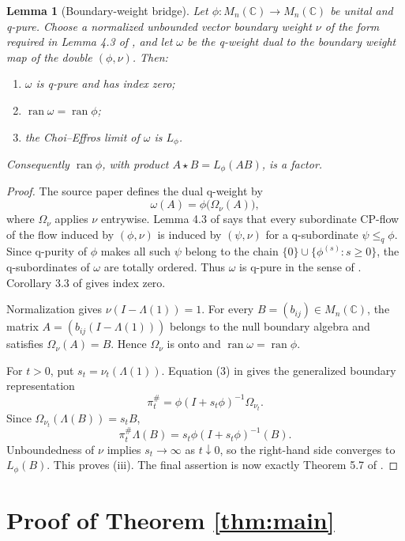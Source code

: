 \documentclass[11pt]{article}
\newtheorem{lemma}{Lemma}
\newcommand{\C}{\mathbb C}
\newcommand{\ran}{\operatorname{ran}}
\begin{document}
\begin{lemma}[Boundary-weight bridge]\label{lem:bridge}
Let $\phi:M_n(\C)\to M_n(\C)$ be unital and q-pure.  Choose a normalized
unbounded vector boundary weight $\nu$ of the form required in Lemma 4.3 of
\cite{Jankowski2009}, and let $\omega$ be the q-weight dual to the boundary
weight map of the double $(\phi,\nu)$. Then:
\begin{enumerate}[label=(\roman*),leftmargin=2.2em]
  \item $\omega$ is q-pure and has index zero;
  \item $\ran\omega=\ran\phi$;
  \item the Choi--Effros limit of $\omega$ is $L_\phi$.
\end{enumerate}
Consequently $\ran\phi$, with product $A\star B=L_\phi(AB)$, is a factor.
\end{lemma}

\begin{proof}
The source paper defines the dual q-weight by
\[
  \omega(A)=\phi\bigl(\Omega_\nu(A)\bigr),
\]
where $\Omega_\nu$ applies $\nu$ entrywise.  Lemma 4.3 of
\cite{Jankowski2009} says that every subordinate CP-flow of the flow induced
by $(\phi,\nu)$ is induced by $(\psi,\nu)$ for a q-subordinate
$\psi\leq_q\phi$.  Since q-purity of $\phi$ makes all such $\psi$ belong to
the chain $\{0\}\cup\{\phi^{(s)}:s\geq0\}$, the q-subordinates of $\omega$
are totally ordered.  Thus $\omega$ is q-pure in the sense of
\cite[Definition 1.2]{JMP2018}.  Corollary 3.3 of
\cite{Jankowski2009} gives index zero.

Normalization gives $\nu(I-\Lambda(1))=1$.  For every $B=(b_{ij})\in
M_n(\C)$, the matrix $A=(b_{ij}(I-\Lambda(1)))$ belongs to the null boundary
algebra and satisfies $\Omega_\nu(A)=B$.  Hence $\Omega_\nu$ is onto and
$\ran\omega=\ran\phi$.

For $t>0$, put $s_t=\nu_t(\Lambda(1))$.  Equation (3) in
\cite{Jankowski2009} gives the generalized boundary representation
\[
  \pi_t^\#=\phi(I+s_t\phi)^{-1}\Omega_{\nu_t}.
\]
Since $\Omega_{\nu_t}(\Lambda(B))=s_tB$,
\[
  \pi_t^\#\Lambda(B)=s_t\phi(I+s_t\phi)^{-1}(B).
\]
Unboundedness of $\nu$ implies $s_t\to\infty$ as $t\downarrow0$, so the
right-hand side converges to $L_\phi(B)$.  This proves (iii).
The final assertion is now exactly Theorem 5.7 of \cite{JMP2018}.
\end{proof}

\section{Proof of Theorem \ref{thm:main}}
\end{document}
